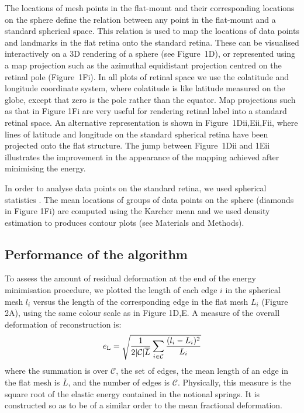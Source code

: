 \documentclass[10pt]{article}
\newcounter{Figure}
\begin{document}
The locations of mesh points in the flat-mount and their corresponding
locations on the sphere define the relation between any point in the
flat-mount and a standard spherical space. This relation  is used to
map the locations of data points and landmarks in the flat retina
onto the standard retina. These can be visualised interactively on a
3D rendering of a sphere (see Figure~1D), or represented using a map
projection such as the azimuthal equidistant projection centred on
the retinal pole (Figure~1Fi). In all plots of retinal space we use
the colatitude and longitude coordinate system, where colatitude is
like latitude measured on the globe, except that zero is the pole
rather than the equator. Map projections \cite{UGS2006} such as that in
Figure 1Fi are very useful for rendering retinal label into a
standard retinal space.  An alternative representation is shown in
Figure~1Dii,Eii,Fii, where lines of latitude and longitude on the
standard spherical retina have been projected onto the flat
structure. The jump between Figure~1Dii and 1Eii illustrates the
improvement in the appearance of the mapping achieved after
minimising the energy. 

In order to analyse data points on the standard retina, we used
spherical statistics \cite{FisherEtal1987}. The mean locations of
groups of data points on the sphere (diamonds in Figure 1Fi) are
computed using the Karcher mean and we used density estimation to
produces contour plots (see Materials and Methods). 

\subsection*{Performance of the algorithm}
To assess the amount of residual deformation at the end of the energy
minimisation procedure, we plotted the length of each edge $i$
in the spherical mesh  $l_i$ versus the length of the corresponding
edge in the flat mesh  $L_i$ (Figure 2A), using the same  colour
scale as in Figure 1D,E. A measure of the overall deformation of
reconstruction is:
\begin{equation}
e_{\text L}=\sqrt{\frac 1{2|\mathcal{C}|\overline L}\sum _{i\in\mathcal{C}}\frac{(l_i-L_i)^2}{L_i}}
\end{equation}
where the summation is over $\mathcal{C}$, the set of edges, the mean
length of an edge in the flat mesh is  $\overline L$, and the number
of edges is {\textbar}$\mathcal{C}${\textbar}. Physically, this measure
is the square root of the elastic energy contained in the notional
springs. It is constructed so as to be of a similar order to the mean
fractional deformation.
\end{document}
